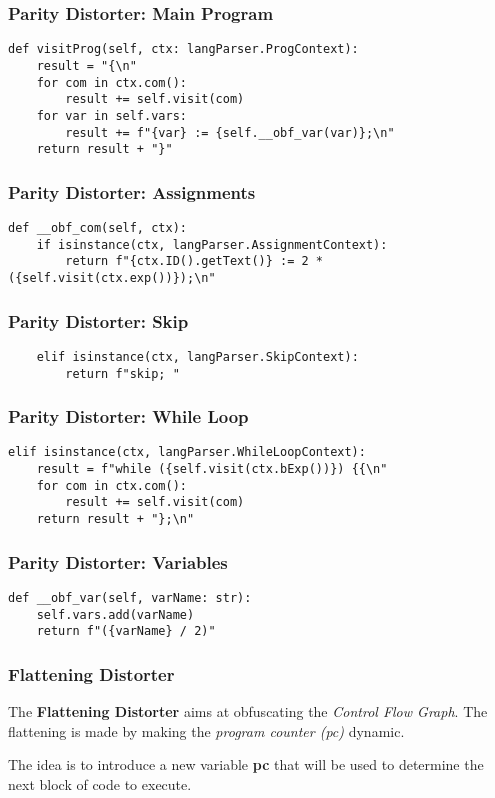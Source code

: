 \documentclass{beamer}
\begin{document}
\begin{frame}[fragile]
    \frametitle{Parity Distorter: Main Program}
    \scriptsize
    \begin{verbatim}
def visitProg(self, ctx: langParser.ProgContext):
    result = "{\n"
    for com in ctx.com():
        result += self.visit(com)
    for var in self.vars:
        result += f"{var} := {self.__obf_var(var)};\n"
    return result + "}"
\end{verbatim}
\end{frame}

\begin{frame}[fragile]
    \frametitle{Parity Distorter: Assignments}
    \scriptsize
    \begin{verbatim}
def __obf_com(self, ctx):
    if isinstance(ctx, langParser.AssignmentContext):
        return f"{ctx.ID().getText()} := 2 * ({self.visit(ctx.exp())});\n"
    \end{verbatim}
\end{frame}

\begin{frame}[fragile]
    \frametitle{Parity Distorter: Skip}
    \scriptsize
    \begin{verbatim}
    elif isinstance(ctx, langParser.SkipContext):
        return f"skip; "
    \end{verbatim}
\end{frame}

\begin{frame}[fragile]
    \frametitle{Parity Distorter: While Loop}
    \scriptsize
    \begin{verbatim}
elif isinstance(ctx, langParser.WhileLoopContext):
    result = f"while ({self.visit(ctx.bExp())}) {{\n"
    for com in ctx.com():
        result += self.visit(com)
    return result + "};\n"
    \end{verbatim}
\end{frame}

\begin{frame}[fragile]
    \frametitle{Parity Distorter: Variables}
    \scriptsize
    \begin{verbatim}
def __obf_var(self, varName: str):
    self.vars.add(varName)
    return f"({varName} / 2)"
    \end{verbatim}
\end{frame}


\begin{frame}
    \frametitle{Flattening Distorter}
    The \textbf{Flattening Distorter} aims at obfuscating the \textit{Control Flow Graph}.
    The flattening is made by making the \textit{program counter (pc)} dynamic.

    The idea is to introduce a new variable \textbf{pc} that will be used to determine the next block of code to execute.
\end{frame}
\end{document}
